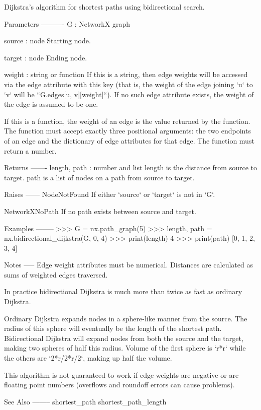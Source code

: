 \begin{DoxyVerb}Dijkstra's algorithm for shortest paths using bidirectional search.

Parameters
----------
G : NetworkX graph

source : node
    Starting node.

target : node
    Ending node.

weight : string or function
    If this is a string, then edge weights will be accessed via the
    edge attribute with this key (that is, the weight of the edge
    joining `u` to `v` will be ``G.edges[u, v][weight]``). If no
    such edge attribute exists, the weight of the edge is assumed to
    be one.

    If this is a function, the weight of an edge is the value
    returned by the function. The function must accept exactly three
    positional arguments: the two endpoints of an edge and the
    dictionary of edge attributes for that edge. The function must
    return a number.

Returns
-------
length, path : number and list
    length is the distance from source to target.
    path is a list of nodes on a path from source to target.

Raises
------
NodeNotFound
    If either `source` or `target` is not in `G`.

NetworkXNoPath
    If no path exists between source and target.

Examples
--------
>>> G = nx.path_graph(5)
>>> length, path = nx.bidirectional_dijkstra(G, 0, 4)
>>> print(length)
4
>>> print(path)
[0, 1, 2, 3, 4]

Notes
-----
Edge weight attributes must be numerical.
Distances are calculated as sums of weighted edges traversed.

In practice  bidirectional Dijkstra is much more than twice as fast as
ordinary Dijkstra.

Ordinary Dijkstra expands nodes in a sphere-like manner from the
source. The radius of this sphere will eventually be the length
of the shortest path. Bidirectional Dijkstra will expand nodes
from both the source and the target, making two spheres of half
this radius. Volume of the first sphere is `\pi*r*r` while the
others are `2*\pi*r/2*r/2`, making up half the volume.

This algorithm is not guaranteed to work if edge weights
are negative or are floating point numbers
(overflows and roundoff errors can cause problems).

See Also
--------
shortest_path
shortest_path_length
\end{DoxyVerb}
 \mbox{\label{namespacenetworkx_1_1algorithms_1_1shortest__paths_1_1weighted_a095dd1ac8fbd1166cdfec7a044b2a751}} 
